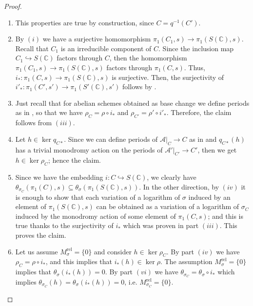 \documentclass[10 pt,a4paper]{article}
\theoremstyle{plain}
\theoremstyle{definition}
\theoremstyle{named}
\newcommand{\cA}{\mathcal A}
\newcommand{\bC}{\mathbb C}
\begin{document}
\begin{proof}
\begin{enumerate}
        \item[$(ii)$] This properties are true by construction, since $C=q^{-1}(C')$.

        \item[$(iii)$] By $(i)$ we have a surjective homomorphism $\pi_1(C_1,s) \to \pi_1(S(\bC),s)$. Recall that $C_1$ is an irreducible component of $C$. Since the inclusion map $C_1 \hookrightarrow S(\bC)$ factors through $C$, then the homomorphism $\pi_1(C_1,s) \to \pi_1(S(\bC),s)$ factors through $\pi_1(C,s)$. Thus, $i_*:\pi_1(C,s) \to \pi_1(S(\bC),s)$ is surjective. Then, the surjectivity of $i'_*:\pi_1(C',s') \to \pi_1(S'(\bC),s')$ follows by .

        \item[$(iv)$] Just recall that for abelian schemes obtained as base change we define periods as in , so that we have $\rho_C=\rho\circ i_*$ and $\rho_{C'}=\rho'\circ i'_*$. Therefore, the claim follows from $(iii)$.

        \item[$(v)$] Let $h \in \ker{q_{C*}}$. Since we can define periods of $\cA|_C \to C$ as in  and $q_{C*}(h)$ has a trivial monodromy action on the periods of $\cA'|_{C'} \to C'$, then we get $h \in \ker{\rho_C}$; hence the claim.

        \item[$(vi)$] Since we have the embedding $i:C \hookrightarrow S(\bC)$, we clearly have $\theta_{\sigma_C}(\pi_1(C),s) \subseteq \theta_\sigma(\pi_1(S(\bC),s))$. In the other direction, by $(iv)$ it is enough to show that each variation of a logarithm of $\sigma$ induced by an element of $\pi_1(S(\bC),s)$ can be obtained as a variation of a logarithm of $\sigma_C$ induced by the monodromy action of some element of $\pi_1(C,s)$; and this is true thanks to the surjectivity of $i_*$ which was proven in part $(iii)$. This proves the claim.

        \item[$(vii)$] Let us assume $M_\sigma^\textrm{rel}=\{0\}$ and consider $h \in \ker{\rho_C}$. By part $(iv)$ we have $\rho_C=\rho\circ i_*$, and this implies that $i_*(h) \in \ker{\rho}$. The assumption $M_\sigma^\textrm{rel}=\{0\}$ implies that $\theta_\sigma(i_*(h))=0$. By part $(vi)$ we have $\theta_{\sigma_C}=\theta_\sigma \circ i_*$ which implies $\theta_{\sigma_C}(h)=\theta_\sigma(i_*(h))=0$, i.e. $M_{\sigma_C}^\textrm{rel}=\{0\}$.
    \end{enumerate}
\end{proof}
\end{document}
